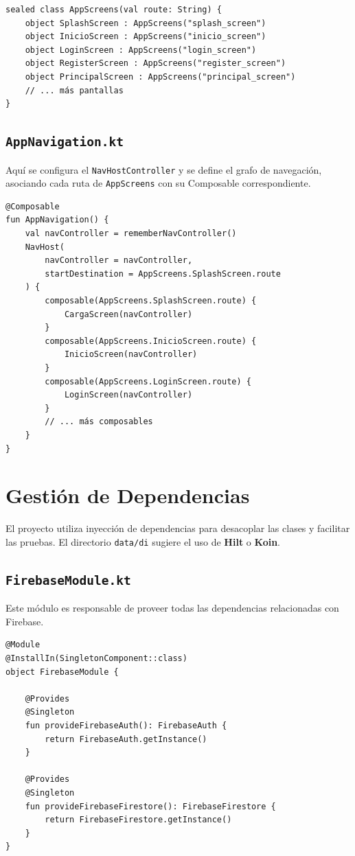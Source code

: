 \documentclass[12pt, a4paper]{article}
\begin{document}
\begin{lstlisting}[caption={Ejemplo de AppScreens.kt}, label={lst:screens}]
sealed class AppScreens(val route: String) {
    object SplashScreen : AppScreens("splash_screen")
    object InicioScreen : AppScreens("inicio_screen")
    object LoginScreen : AppScreens("login_screen")
    object RegisterScreen : AppScreens("register_screen")
    object PrincipalScreen : AppScreens("principal_screen")
    // ... más pantallas
}
\end{lstlisting}

\subsection{\texttt{AppNavigation.kt}}
Aquí se configura el \texttt{NavHostController} y se define el grafo de navegación, asociando cada ruta de \texttt{AppScreens} con su Composable correspondiente.

\begin{lstlisting}[caption={Ejemplo de AppNavigation.kt}, label={lst:navigation}]
@Composable
fun AppNavigation() {
    val navController = rememberNavController()
    NavHost(
        navController = navController,
        startDestination = AppScreens.SplashScreen.route
    ) {
        composable(AppScreens.SplashScreen.route) {
            CargaScreen(navController)
        }
        composable(AppScreens.InicioScreen.route) {
            InicioScreen(navController)
        }
        composable(AppScreens.LoginScreen.route) {
            LoginScreen(navController)
        }
        // ... más composables
    }
}
\end{lstlisting}

\newpage

\section{Gestión de Dependencias}
El proyecto utiliza inyección de dependencias para desacoplar las clases y facilitar las pruebas. El directorio \texttt{data/di} sugiere el uso de \textbf{Hilt} o \textbf{Koin}.

\subsection{\texttt{FirebaseModule.kt}}
Este módulo es responsable de proveer todas las dependencias relacionadas con Firebase.

\begin{lstlisting}[caption={Ejemplo de FirebaseModule.kt con Hilt}, label={lst:firebase_module}]
@Module
@InstallIn(SingletonComponent::class)
object FirebaseModule {

    @Provides
    @Singleton
    fun provideFirebaseAuth(): FirebaseAuth {
        return FirebaseAuth.getInstance()
    }

    @Provides
    @Singleton
    fun provideFirebaseFirestore(): FirebaseFirestore {
        return FirebaseFirestore.getInstance()
    }
}
\end{lstlisting}
\end{document}
